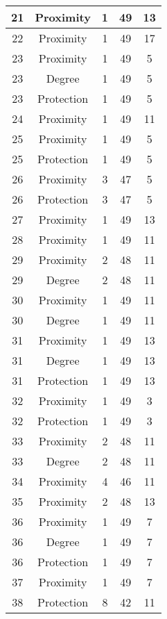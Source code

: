 \documentclass[results.tex]{subfiles}
\begin{document}
\begin{center}
\begin{tabular}{| c || c | c | c | c |}
    \hline
    21 & Proximity & 1 & 49 & 13 \\ 
    \hline
    22 & Proximity & 1 & 49 & 17 \\ 
    \hline
    23 & Proximity & 1 & 49 & 5 \\ 
    \hline
    23 & Degree & 1 & 49 & 5 \\ 
    \hline
    23 & Protection & 1 & 49 & 5 \\ 
    \hline
    24 & Proximity & 1 & 49 & 11 \\ 
    \hline
    25 & Proximity & 1 & 49 & 5 \\ 
    \hline
    25 & Protection & 1 & 49 & 5 \\ 
    \hline
    26 & Proximity & 3 & 47 & 5 \\ 
    \hline
    26 & Protection & 3 & 47 & 5 \\ 
    \hline
    27 & Proximity & 1 & 49 & 13 \\ 
    \hline
    28 & Proximity & 1 & 49 & 11 \\ 
    \hline
    29 & Proximity & 2 & 48 & 11 \\ 
    \hline
    29 & Degree & 2 & 48 & 11 \\ 
    \hline
    30 & Proximity & 1 & 49 & 11 \\ 
    \hline
    30 & Degree & 1 & 49 & 11 \\ 
    \hline
    31 & Proximity & 1 & 49 & 13 \\ 
    \hline
    31 & Degree & 1 & 49 & 13 \\ 
    \hline
    31 & Protection & 1 & 49 & 13 \\ 
    \hline
    32 & Proximity & 1 & 49 & 3 \\ 
    \hline
    32 & Protection & 1 & 49 & 3 \\ 
    \hline
    33 & Proximity & 2 & 48 & 11 \\ 
    \hline
    33 & Degree & 2 & 48 & 11 \\ 
    \hline
    34 & Proximity & 4 & 46 & 11 \\ 
    \hline
    35 & Proximity & 2 & 48 & 13 \\ 
    \hline
    36 & Proximity & 1 & 49 & 7 \\ 
    \hline
    36 & Degree & 1 & 49 & 7 \\ 
    \hline
    36 & Protection & 1 & 49 & 7 \\ 
    \hline
    37 & Proximity & 1 & 49 & 7 \\ 
    \hline
    38 & Protection & 8 & 42 & 11 \\ 

\end{tabular}
\end{center}
\end{document}
